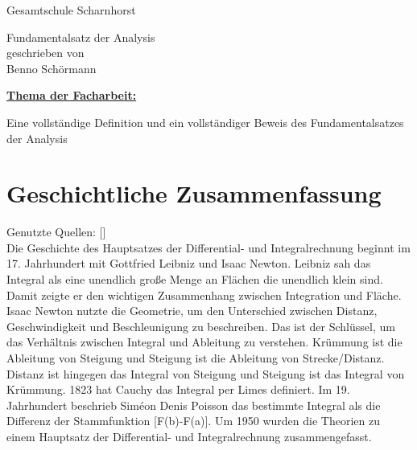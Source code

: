 \documentclass[fontsize=12pt,paper=a4,DIV12,cleardoublepage=empty, 
liststotoc,idxtotoc,bibtotoc]{article}
\theoremstyle{plain}
\theoremstyle{definition}
\begin{document}
	\begin{titlepage}
		\vspace*{-3cm}
		\noindent
		\hspace*{1cm}
			\begin{center}
				\centering
				{\LARGE Gesamtschule Scharnhorst}
			\end{center}
		\begin{center}
		\Large{Fundamentalsatz der Analysis}\\[0.5cm]
		\normalsize{geschrieben von}\\[0.25cm]	
		\large{Benno Schörmann}\\[0.5cm]
		\end{center}
	\begin{flushleft}
	\hyperref[subsec:thema1]{\textbf{\large Thema der Facharbeit:}}  \\
	\end{flushleft}
	Eine vollständige Definition und ein vollständiger Beweis des Fundamentalsatzes der Analysis
	\quad \\[1.5cm]
	\noindent 
	\renewcommand{\arraystretch}{1.4}
	\end{titlepage}
	\newpage
	\thispagestyle{empty}
	\tableofcontents
	\newpage
	
	
	
	\section{Geschichtliche Zusammenfassung}
	Genutzte Quellen: [\cite[vgl.]{DMB}]\\
	Die Geschichte des Hauptsatzes der Differential- und Integralrechnung beginnt im 17. Jahrhundert mit Gottfried Leibniz und Isaac Newton. Leibniz sah das Integral als eine unendlich große Menge an Flächen die unendlich klein sind. Damit zeigte er den wichtigen Zusammenhang zwischen Integration und Fläche. Isaac Newton nutzte die Geometrie, um den Unterschied zwischen Distanz, Geschwindigkeit und Beschleunigung zu beschreiben. Das ist der Schlüssel, um das Verhältnis zwischen Integral und Ableitung zu verstehen. Krümmung ist die Ableitung von Steigung und Steigung ist die Ableitung von Strecke/Distanz. Distanz ist hingegen das Integral von Steigung und Steigung ist das Integral von Krümmung. 1823 hat Cauchy das Integral per Limes definiert. Im 19. Jahrhundert beschrieb Siméon Denis Poisson das bestimmte Integral als die Differenz der Stammfunktion [F(b)-F(a)]. Um 1950 wurden die Theorien zu einem Hauptsatz der Differential- und Integralrechnung zusammengefasst.
\newpage
	
\end{document}
